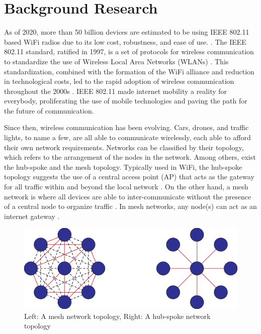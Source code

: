 
\section{Background Research}

As of 2020, more than 50 billion devices are estimated to be using IEEE 802.11 based WiFi radios due to its low cost, robustness, and ease of use. \cite{G_Davis_2018}. The IEEE 802.11 standard, ratified in 1997, is a set of protocols for wireless communication to standardize the use of Wireless Local Area Networks (WLANs) \cite{perahia2013next}. This standardization, combined with the formation of the WiFi alliance and reduction in technological costs, led to the rapid adoption of wireless communication throughout the 2000s \cite{perahia2013next}. IEEE 802.11 made internet mobility a reality for everybody, proliferating the use of mobile technologies and paving the path for the future of communication. 


Since then, wireless communication has been evolving. Cars, drones, and traffic lights, to name a few, are all able to communicate wirelessly, each able to afford their own network requirements. Networks can be classified by their topology, which refers to the arrangement of the nodes in the network. Among others, exist the hub-spoke and the mesh topology. Typically used in WiFi, the hub-spoke topology suggests the use of a central access point (AP) that acts as the gateway for all traffic within and beyond the local network \cite{ti_lethaby2017wireless}. On the other hand, a mesh network is where all devices are able to inter-communicate without the presence of a central node to organize traffic \cite{ti_lethaby2017wireless}. In mesh networks, any node(s) can act as an internet gateway \cite{ti_lethaby2017wireless}. 

\begin{figure}[H]
    \centering
    \includegraphics[width=0.5\columnwidth]{final-proposal/images/mesh_vs_hub_spoke.png}
    \caption{Left: A mesh network topology, Right: A hub-spoke network topology}
    \label{fig:consensus_mesh}
\end{figure}

